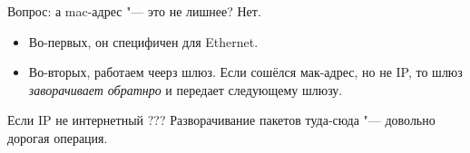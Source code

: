 Вопрос: а mac-адрес "--- это не лишнее?
Нет. 
\begin{itemize}
\item Во-первых, он специфичен для Ethernet.

\item Во-вторых, работаем чеерз шлюз. 
Если сошёлся мак-адрес, но не IP, то шлюз \textit{заворачивает обратнро} и передает следующему шлюзу.
\end{itemize}

Если IP не интернетный ???
Разворачивание пакетов туда-сюда "--- довольно дорогая операция. %
